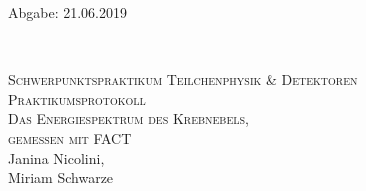 



\begin{titlepage}
  \begin{flushleft}
 Abgabe: 21.06.2019
  \end{flushleft}


\HRule\\[1,0cm]

 \begin{center}


  \textsc{\Large Schwerpunktspraktikum Teilchenphysik \& Detektoren}\\[1.5cm]
  \textsc{\LARGE Praktikumsprotokoll}\\[1.5cm]
\textsc{\huge Das Energiespektrum des Krebnebels,\\ gemessen mit FACT} \\[5,5cm]

Janina Nicolini\footnotemark[1], \\
Miriam Schwarze\footnotemark[2] \\[1,0cm]



 \end{center}
\HRule

 \vfill

\end{titlepage}



\newpage



\printbibliography


